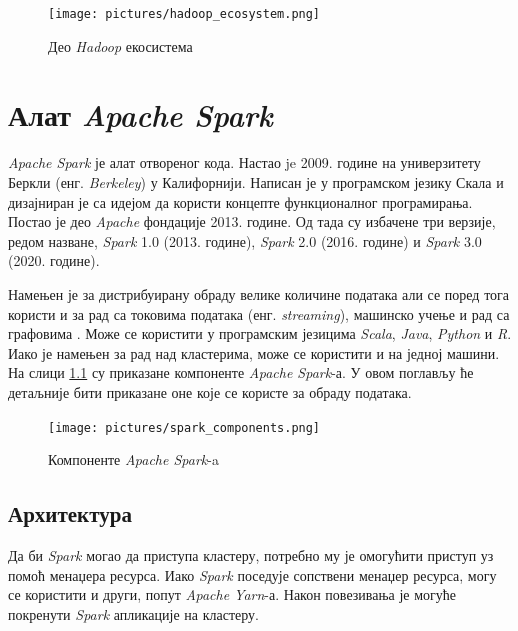 \documentclass[12pt,oneside]{memoir}
\begin{document}
\begin{figure}[!ht]
  \centering
  \texttt{[image: pictures/hadoop\_ecosystem.png]}
  \caption{Део \textit{Hadoop} екосистема}
  \label{fig:hadoop_ecosystem}
\end{figure}

\chapter{Алат \textit{Apache Spark}}
\label{chp:spark}


\textit{Apache Spark} је алат отвореног кода. Настао je 2009. године на универзитету Беркли (енг. \textit{Berkeley}) у Калифорнији. Написан је у програмском језику Скала и дизајниран је са идејом да користи концепте функционалног програмирања. Постао је део \textit{Apache} фондације 2013. године. Од тада су избачене три верзије, редом назване, \textit{Spark} 1.0 (2013. године), \textit{Spark} 2.0 (2016. године) и \textit{Spark} 3.0 (2020. године).

Намењен је за дистрибуирану обраду велике количине података али се поред тога користи и за рад са токовима података (енг. \textit{streaming}), машинско учење и рад са графовима \cite{spark_guide}. Може се користити у програмским језицима \textit{Scala}, \textit{Java}, \textit{Python} и \textit{R}. Иако је намењен за рад над кластерима, може се користити и на једној машини. На слици \ref{fig:spark_kompot} су приказане компоненте \textit{Apache Spark}-а. У овом поглављу ће детаљније бити приказане оне које се користе за обраду података.

\begin{figure}[!ht]
  \centering
  \texttt{[image: pictures/spark\_components.png]}
  \caption{Компоненте \textit{Apache Spark}-a}
  \label{fig:spark_kompot}
\end{figure}

\section{Архитектура}
\label{sec:spark_arx}

Да би \textit{Spark} могао да приступа кластеру, потребно му је омогућити приступ уз помоћ менаџера ресурса. Иако \textit{Spark} поседује сопствени менаџер ресурса, могу се користити и други, попут \textit{Apache Yarn}-а. Након повезивања је могуће покренути \textit{Spark} апликације на кластеру. 
\end{document}
